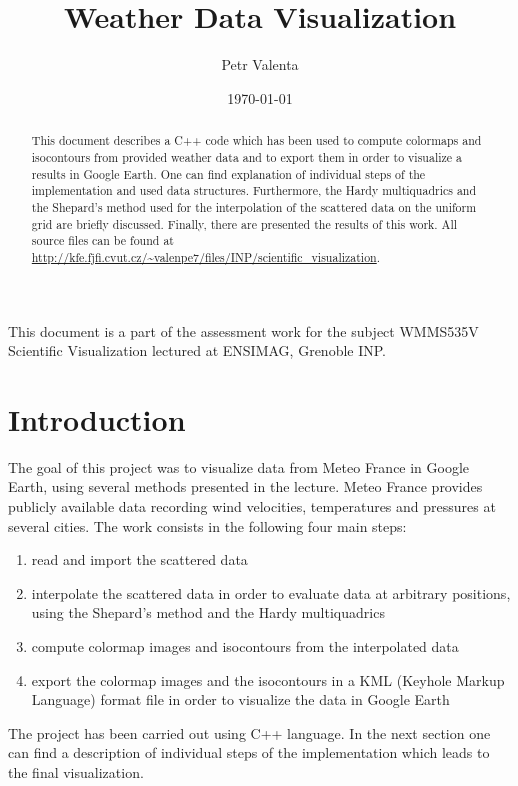 \documentclass[a4paper, 10pt]{article}
\title{\horrule{0.5 pt}\\[0.4cm] \textbf{Weather Data Visualization} \horrule{1 pt}}
\author{Petr Valenta}
\date{\today}
\begin{document}
\maketitle
{\small This document is a part of the assessment work for the subject WMMS535V Scientific Visualization lectured at ENSIMAG, Grenoble INP.}

\begin{abstract}
This document describes a C++ code which has been used to compute colormaps and isocontours from provided weather data and to export them in order to visualize a results in Google Earth. One can find explanation of individual steps of the implementation and used data structures. Furthermore, the Hardy multiquadrics and the Shepard's method used for the interpolation of the scattered data on the uniform grid are briefly discussed. Finally, there are presented the results of this work. All source files can be found at \url{http://kfe.fjfi.cvut.cz/~valenpe7/files/INP/scientific_visualization}.
\end{abstract}

\tableofcontents

\section{Introduction}
The goal of this project was to visualize data from Meteo France in Google Earth, using several methods presented in the lecture. Meteo France provides publicly available data recording wind velocities, temperatures and pressures at several cities. The work consists in the following four main steps:
\begin{enumerate}
	\setlength{\itemsep}{0cm}%
	\item read and import the scattered data
	\item interpolate the scattered data in order to evaluate data at arbitrary positions, using the Shepard's method and the Hardy multiquadrics
	\item compute colormap images and isocontours from the interpolated data
	\item export the colormap images and the isocontours in a KML (Keyhole Markup Language) format file in order to visualize the data in Google Earth
\end{enumerate}
The project has been carried out using C++ language. In the next section one can find a description of individual steps of the implementation which leads to the final visualization.
\end{document}
